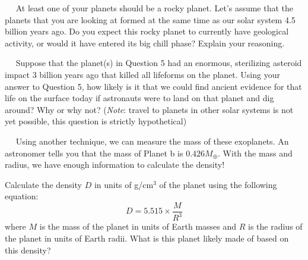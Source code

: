 \documentclass[12pt]{article}
\newcommand{\question}[1]{\vspace{10mm} \noindent {\bf #1)}~~}
\begin{document}
\pagebreak
\question{5} At least one of your planets should be a rocky planet. Let's assume that the planets that you are looking at formed at the same time as our solar system 4.5 billion years ago. Do you expect this rocky planet to currently have geological activity, or would it have entered its big chill phase? Explain your reasoning.
\vspace{4 cm}


\question{6} Suppose that the planet(s) in Question 5 had an enormous, sterilizing asteroid impact 3 billion years ago that killed all lifeforms on the planet. Using your answer to Question 5, how likely is it that we could find ancient evidence for that life on the surface today if astronauts were to land on that planet and dig around? Why or why not? ({\it Note}: travel to planets in other solar systems is not yet possible, this question is strictly hypothetical)
\vspace{4 cm}

\question{7} Using another technique, we can measure the mass of these exoplanets. An astronomer tells you that the mass of Planet b is $0.426 M_\oplus$. With the mass and radius, we have enough information to calculate the density! 

Calculate the density $D$ in units of g/cm$^3$ of the planet using the following equation: 
\begin{equation}
D = 5.515 \times \frac{M}{R^3}
\end{equation}
where $M$ is the mass of the planet in units of Earth masses and $R$ is the radius of the planet in units of Earth radii. What is this planet likely made of based on this density?
\end{document}
